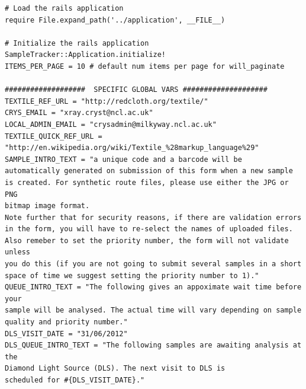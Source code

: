 \documentclass[12pt,twoside]{article}
\begin{document}
\small
\begin{verbatim}
# Load the rails application
require File.expand_path('../application', __FILE__)

# Initialize the rails application
SampleTracker::Application.initialize!
ITEMS_PER_PAGE = 10 # default num items per page for will_paginate

###################  SPECIFIC GLOBAL VARS ####################
TEXTILE_REF_URL = "http://redcloth.org/textile/"
CRYS_EMAIL = "xray.cryst@ncl.ac.uk"
LOCAL_ADMIN_EMAIL = "crysadmin@milkyway.ncl.ac.uk"
TEXTILE_QUICK_REF_URL = "http://en.wikipedia.org/wiki/Textile_%28markup_language%29"
SAMPLE_INTRO_TEXT = "a unique code and a barcode will be
automatically generated on submission of this form when a new sample
is created. For synthetic route files, please use either the JPG or PNG
bitmap image format.
Note further that for security reasons, if there are validation errors
in the form, you will have to re-select the names of uploaded files.
Also remeber to set the priority number, the form will not validate unless
you do this (if you are not going to submit several samples in a short
space of time we suggest setting the priority number to 1)."
QUEUE_INTRO_TEXT = "The following gives an appoximate wait time before your 
sample will be analysed. The actual time will vary depending on sample 
quality and priority number."
DLS_VISIT_DATE = "31/06/2012"
DLS_QUEUE_INTRO_TEXT = "The following samples are awaiting analysis at the 
Diamond Light Source (DLS). The next visit to DLS is 
scheduled for #{DLS_VISIT_DATE}."
\end{verbatim}
\normalsize
\end{document}
